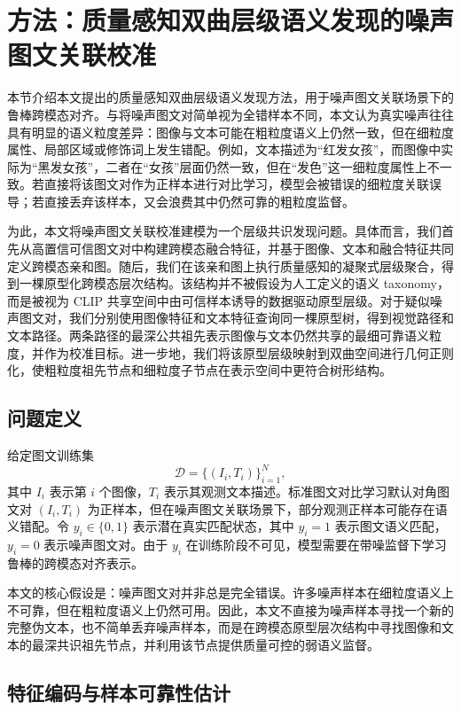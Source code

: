 \section{方法：质量感知双曲层级语义发现的噪声图文关联校准}
\label{sec:method}

本节介绍本文提出的质量感知双曲层级语义发现方法，用于噪声图文关联场景下的鲁棒跨模态对齐。与将噪声图文对简单视为全错样本不同，本文认为真实噪声往往具有明显的语义粒度差异：图像与文本可能在粗粒度语义上仍然一致，但在细粒度属性、局部区域或修饰词上发生错配。例如，文本描述为“红发女孩”，而图像中实际为“黑发女孩”，二者在“女孩”层面仍然一致，但在“发色”这一细粒度属性上不一致。若直接将该图文对作为正样本进行对比学习，模型会被错误的细粒度关联误导；若直接丢弃该样本，又会浪费其中仍然可靠的粗粒度监督。

为此，本文将噪声图文关联校准建模为一个层级共识发现问题。具体而言，我们首先从高置信可信图文对中构建跨模态融合特征，并基于图像、文本和融合特征共同定义跨模态亲和图。随后，我们在该亲和图上执行质量感知的凝聚式层级聚合，得到一棵原型化跨模态层次结构。该结构并不被假设为人工定义的语义 taxonomy，而是被视为 CLIP 共享空间中由可信样本诱导的数据驱动原型层级。对于疑似噪声图文对，我们分别使用图像特征和文本特征查询同一棵原型树，得到视觉路径和文本路径。两条路径的最深公共祖先表示图像与文本仍然共享的最细可靠语义粒度，并作为校准目标。进一步地，我们将该原型层级映射到双曲空间进行几何正则化，使粗粒度祖先节点和细粒度子节点在表示空间中更符合树形结构。

\subsection{问题定义}

给定图文训练集
\begin{equation}
    \mathcal{D}=\{(I_i,T_i)\}_{i=1}^{N},
\end{equation}
其中 $I_i$ 表示第 $i$ 个图像，$T_i$ 表示其观测文本描述。标准图文对比学习默认对角图文对 $(I_i,T_i)$ 为正样本，但在噪声图文关联场景下，部分观测正样本可能存在语义错配。令 $y_i\in\{0,1\}$ 表示潜在真实匹配状态，其中 $y_i=1$ 表示图文语义匹配，$y_i=0$ 表示噪声图文对。由于 $y_i$ 在训练阶段不可见，模型需要在带噪监督下学习鲁棒的跨模态对齐表示。

本文的核心假设是：噪声图文对并非总是完全错误。许多噪声样本在细粒度语义上不可靠，但在粗粒度语义上仍然可用。因此，本文不直接为噪声样本寻找一个新的完整伪文本，也不简单丢弃噪声样本，而是在跨模态原型层次结构中寻找图像和文本的最深共识祖先节点，并利用该节点提供质量可控的弱语义监督。

\subsection{特征编码与样本可靠性估计}

